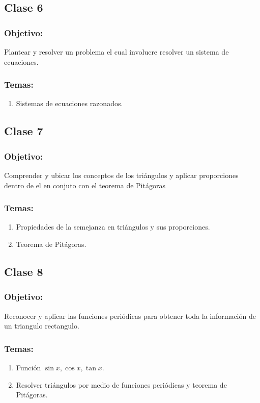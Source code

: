 \documentclass[12pt,letterpaper]{report}
\begin{document}
\subsection*{Clase 6}
\subsubsection*{Objetivo:}
Plantear y resolver un problema el cual involucre resolver un sistema de ecuaciones.
\subsubsection*{Temas:}
\begin{enumerate}
    \item Sistemas de ecuaciones razonados.
\end{enumerate}
\subsection*{Clase 7}
\subsubsection*{Objetivo:}
Comprender y ubicar los conceptos de los triángulos y aplicar proporciones dentro de el en conjuto con el teorema de Pitágoras
\subsubsection*{Temas:}
\begin{enumerate}
    \item Propiedades de la semejanza en triángulos y sus proporciones.
    \item Teorema de Pitágoras.
\end{enumerate}
\subsection*{Clase 8}
\subsubsection*{Objetivo:}
Reconocer y aplicar las funciones periódicas para obtener toda la información de un triangulo rectangulo.
\subsubsection*{Temas:}
\begin{enumerate}
    \item Función $\sin{x}, \cos{x}, \tan{x}$.
    \item Resolver triángulos por medio de funciones periódicas y teorema de Pitágoras.
\end{enumerate}
\end{document}
